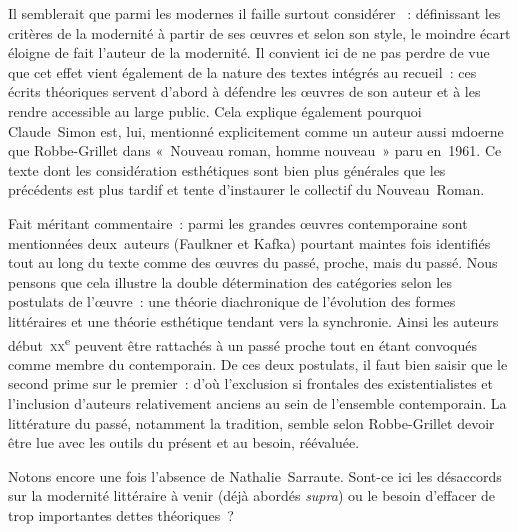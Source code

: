 \documentclass[12pt, a4paper]{article}
\begin{document}
Il semblerait que parmi les modernes il faille surtout considérer \robbe{}~: définissant les critères de la modernité à partir de ses œuvres et selon son style, le moindre écart éloigne de fait l'auteur de la modernité. Il convient ici de ne pas perdre de vue que cet effet vient également de la nature des textes intégrés au recueil~: ces écrits théoriques servent d'abord à défendre les œuvres de son auteur et à les rendre accessible au large public. Cela explique également pourquoi Claude~Simon est, lui, mentionné explicitement comme un auteur aussi mdoerne que Robbe-Grillet dans «~Nouveau roman, homme nouveau~» paru en~1961. Ce texte dont les considération esthétiques sont bien plus générales que les précédents est plus tardif et tente d'instaurer le collectif du Nouveau~Roman.




Fait méritant commentaire~: parmi les grandes œuvres contemporaine sont mentionnées deux~auteurs (Faulkner et Kafka) pourtant maintes fois identifiés tout au long du texte comme des œuvres du passé, proche, mais du passé. Nous pensons que cela illustre la double détermination des catégories selon les postulats de l'œuvre~: une théorie diachronique de l'évolution des formes littéraires et une théorie esthétique tendant vers la synchronie. Ainsi les auteurs début~\textsc{xx}\textsuperscript{e} peuvent être rattachés à un passé proche tout en étant convoqués comme membre du contemporain. De ces deux postulats, il faut bien saisir que le second prime sur le premier~: d'où l'exclusion si frontales des existentialistes et l'inclusion d'auteurs relativement anciens au sein de l'ensemble contemporain. La littérature du passé, notamment la tradition, semble selon Robbe-Grillet devoir être lue avec les outils du présent et au besoin, réévaluée.







Notons encore une fois l'absence de Nathalie~Sarraute. Sont-ce ici les désaccords sur la modernité littéraire à venir (déjà abordés \textit{supra}) ou le besoin d'effacer de trop importantes dettes théoriques~?
\end{document}
